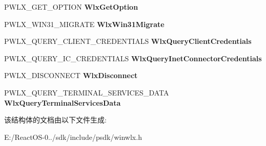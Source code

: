 \begin{DoxyCompactItemize}
P\+W\+L\+X\+\_\+\+G\+E\+T\+\_\+\+O\+P\+T\+I\+ON {\bfseries Wlx\+Get\+Option}
\item 
\mbox{\label{struct___w_l_x___d_i_s_p_a_t_c_h___v_e_r_s_i_o_n__1__3_a7ec4e547e59a3863c2adebe163039f0c}} 
P\+W\+L\+X\+\_\+\+W\+I\+N31\+\_\+\+M\+I\+G\+R\+A\+TE {\bfseries Wlx\+Win31\+Migrate}
\item 
\mbox{\label{struct___w_l_x___d_i_s_p_a_t_c_h___v_e_r_s_i_o_n__1__3_a9bf45a89450c169a12cf6015b4a0f31f}} 
P\+W\+L\+X\+\_\+\+Q\+U\+E\+R\+Y\+\_\+\+C\+L\+I\+E\+N\+T\+\_\+\+C\+R\+E\+D\+E\+N\+T\+I\+A\+LS {\bfseries Wlx\+Query\+Client\+Credentials}
\item 
\mbox{\label{struct___w_l_x___d_i_s_p_a_t_c_h___v_e_r_s_i_o_n__1__3_a61a5679c41b51062ce01a5a17e38cacd}} 
P\+W\+L\+X\+\_\+\+Q\+U\+E\+R\+Y\+\_\+\+I\+C\+\_\+\+C\+R\+E\+D\+E\+N\+T\+I\+A\+LS {\bfseries Wlx\+Query\+Inet\+Connector\+Credentials}
\item 
\mbox{\label{struct___w_l_x___d_i_s_p_a_t_c_h___v_e_r_s_i_o_n__1__3_a9dea4f2e8f07615eb1189ed0cddbf09f}} 
P\+W\+L\+X\+\_\+\+D\+I\+S\+C\+O\+N\+N\+E\+CT {\bfseries Wlx\+Disconnect}
\item 
\mbox{\label{struct___w_l_x___d_i_s_p_a_t_c_h___v_e_r_s_i_o_n__1__3_a1f13397b1202d3c3165002d101935c83}} 
P\+W\+L\+X\+\_\+\+Q\+U\+E\+R\+Y\+\_\+\+T\+E\+R\+M\+I\+N\+A\+L\+\_\+\+S\+E\+R\+V\+I\+C\+E\+S\+\_\+\+D\+A\+TA {\bfseries Wlx\+Query\+Terminal\+Services\+Data}
\end{DoxyCompactItemize}


该结构体的文档由以下文件生成\+:\begin{DoxyCompactItemize}
\item 
E\+:/\+React\+O\+S-\/0../sdk/include/psdk/winwlx.\+h\end{DoxyCompactItemize}
